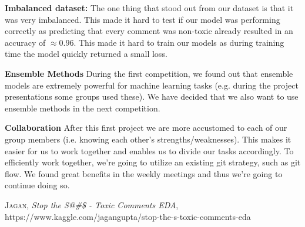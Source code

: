 \documentclass[10pt, a4paper,twocolumn]{article}
\begin{document}
	\textbf{Imbalanced dataset:} The one thing that stood out from our dataset is that it was very imbalanced. This made it hard to test if our model was performing correctly as predicting that every comment was non-toxic already resulted in an accuracy of $\approx 0.96$. This made it hard to train our models as during training time the model quickly returned a small loss.
	
	\textbf{Ensemble Methods} During the first competition, we found out that ensemble models are extremely powerful for machine learning tasks (e.g. during the project presentations some groups used these). We have decided that we also want to use ensemble methods in the next competition.
	
	\textbf{Collaboration} After this first project we are more accustomed to each of our group members (i.e. knowing each other's strengths/weaknesses). This makes it easier for us to work together and enables us to divide our tasks accordingly. To efficiently work together, we're going to utilize an existing git strategy, such as git flow. We found great benefits in the weekly meetings and thus we're going to continue doing so.
	\begin{thebibliography}{xx}
		\textsc{Jagan}, \textit{Stop the S@\#\$ - Toxic Comments EDA},
		 https://www.kaggle.com/jagangupta/stop-the-s-toxic-comments-eda
	\end{thebibliography}
	
\end{document}
